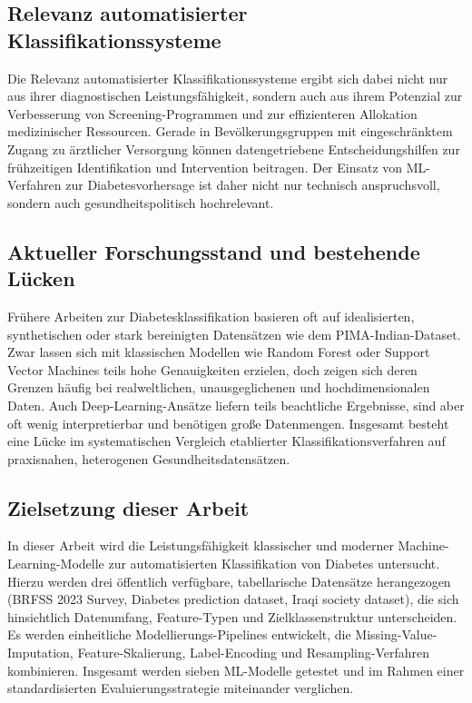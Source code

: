 \documentclass[10pt]{scrartcl}
\begin{document}
\subsection{Relevanz automatisierter Klassifikationssysteme}
Die Relevanz automatisierter Klassifikationssysteme ergibt sich dabei nicht nur aus ihrer diagnostischen Leistungsfähigkeit, sondern auch aus ihrem Potenzial zur Verbesserung von Screening-Programmen und zur effizienteren Allokation medizinischer Ressourcen. Gerade in Bevölkerungsgruppen mit eingeschränktem Zugang zu ärztlicher Versorgung können datengetriebene Entscheidungshilfen zur frühzeitigen Identifikation und Intervention beitragen. Der Einsatz von ML-Verfahren zur Diabetesvorhersage ist daher nicht nur technisch anspruchsvoll, sondern auch gesundheitspolitisch hochrelevant.

\subsection{Aktueller Forschungsstand und bestehende Lücken}
Frühere Arbeiten zur Diabetesklassifikation basieren oft auf idealisierten, synthetischen oder stark bereinigten Datensätzen wie dem PIMA-Indian-Dataset\cite{Abousaber2025}. Zwar lassen sich mit klassischen Modellen wie Random Forest oder Support Vector Machines teils hohe Genauigkeiten erzielen, doch zeigen sich deren Grenzen häufig bei realweltlichen, unausgeglichenen und hochdimensionalen Daten. Auch Deep-Learning-Ansätze liefern teils beachtliche Ergebnisse, sind aber oft wenig interpretierbar und benötigen große Datenmengen. Insgesamt besteht eine Lücke im systematischen Vergleich etablierter Klassifikationsverfahren auf praxisnahen, heterogenen Gesundheitsdatensätzen.

\subsection{Zielsetzung dieser Arbeit}
In dieser Arbeit wird die Leistungsfähigkeit klassischer und moderner Machine-Learning-Modelle zur automatisierten Klassifikation von Diabetes untersucht. Hierzu werden drei öffentlich verfügbare, tabellarische Datensätze herangezogen (BRFSS 2023 Survey, Diabetes prediction dataset, Iraqi society dataset), die sich hinsichtlich Datenumfang, Feature-Typen und Zielklassenstruktur unterscheiden. Es werden einheitliche Modellierungs-Pipelines entwickelt, die Missing-Value-Imputation, Feature-Skalierung, Label-Encoding und Resampling-Verfahren kombinieren. Insgesamt werden sieben ML-Modelle getestet und im Rahmen einer standardisierten Evaluierungsstrategie miteinander verglichen.
\end{document}
